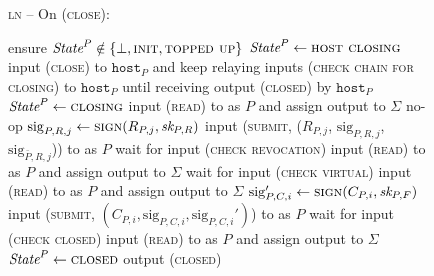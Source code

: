\begin{figure}[H]
  \begin{processbox}{\textsc{ln} -- On (\textsc{close}):}
    \begin{algorithmic}[1]
      \State ensure $\textit{State}^P \notin \{\bot, \textsc{init},
      \textsc{topped up}\}$
       
        \State $\textit{State}^P \gets \textsc{host closing}$
        \State input (\textsc{close}) to $\texttt{host}_P$ and
        keep relaying inputs (\textsc{check chain for closing}) to
        $\texttt{host}_P$ until receiving output (\textsc{closed}) by
        $\texttt{host}_P$
      \EndIf
      \State $\textit{State}^P \gets \textsc{closing}$
      \State input (\textsc{read}) to \ledger as $P$ and assign output to
      $\Sigma$
       
        \State no-op 
        \State $\mathrm{sig}_{P, R, j} \gets \textsc{sign}(R_{P, j}, \textit{sk}_{P, R})$
        \State input (\textsc{submit}, ($R_{P, j}$, $\mathrm{sig}_{P, R, j}$,
        $\mathrm{sig}_{\bar{P}, R, j}$)) to \ledger as $P$
          \State wait for input (\textsc{check revocation}) 
          \State input (\textsc{read}) to \ledger as $P$ and assign output to
          $\Sigma$
        \EndWhile
      \Else \: 
         
          \State wait for input (\textsc{check virtual}) 
          \State input (\textsc{read}) to \ledger as $P$ and assign output to
          $\Sigma$
        \EndWhile
        \State {}
        \State $\mathrm{sig}_{P, C, i}' \gets \textsc{sign}(C_{P, i}, \textit{sk}_{P,
        F})$
        \State input (\textsc{submit}, $(C_{P, i}, \mathrm{sig}_{P, C, i},
        \mathrm{sig}_{P, C, i}')$) to \ledger as $P$
          \State wait for input (\textsc{check closed}) 
          \State input (\textsc{read}) to \ledger as $P$ and assign output to
          $\Sigma$
        \EndWhile
        \State {}
      \EndIf
      \State $\textit{State}^P \gets \textsc{closed}$
      \State output (\textsc{closed})
    \end{algorithmic}
  \end{processbox}
  \caption{}
  \label{code:ln:virtual}
\end{figure}
